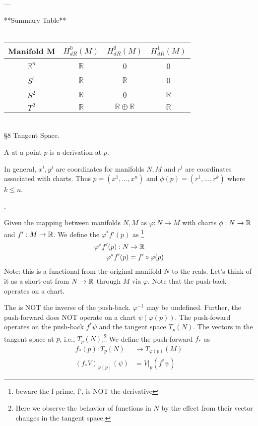\documentclass[10pt,a4paper]{report}
\begin{document}
 ---

 **Summary Table**\\ \\
 \begin{tabular}{|c|c|c|c|}
 \hline
  Manifold M & $H^0_{dR}(M)$ & $H^2_{dR}(M)$& $H^1_{dR}(M)$ \\
 \hline
  \( \mathbb{R}^n \) & \( \mathbb{R} \) & 0 & 0 \\
 \hline
 \( S^1 \) & \( \mathbb{R} \) & \( \mathbb{R} \) & 0 \\
 \hline
  \( S^2 \) & \( \mathbb{R} \) & 0 & \( \mathbb{R} \) \\
 \hline
 \( T^2 \) & \( \mathbb{R} \) & \( \mathbb{R} \oplus \mathbb{R} \) & \( \mathbb{R} \)\\
 \hline
 \end{tabular}\\
 
 \newpage
 \Large{\S 8 Tangent Space.}
 
 \setcounter{chapter}{8}
 \setcounter{section}{1}
 
 \begin{definition}  A  at a point $p$ is a derivation at $p$.
 \end{definition}
 
 \begin{remark}
 
 In general, $x^i, y^j$ are coordinates for manifolds $N,M$ and $r^i$ are coordinates associated with charts.  Thus $p=(x^1, \dots, x^n)$ and $\phi(p)=(r^1, \dots, r^k)$ where $k \le n$.
 \end{remark}
 
 \begin{definition}.
 
 Given the mapping between manifolds $N,M$ as $\varphi: N \to M$ with charts $\phi: N \to \mathbb{R}$ and $f': M \to \mathbb{R}$.  We define the  $\varphi^*f'(p)$ as \footnote{beware the f-prime, f', is NOT the derivative}
 \begin{align*}
 	\varphi^*f'(p): N &\to \mathbb{R} \\
 	\varphi^*f'(p) &= f'\circ \varphi(p)
 \end{align*}Note: this is a functional from the original manifold $N$ to the reals.  Let's think of it as a short-cut from $N \to \mathbb{R}$ through $M$ via $\varphi$.  Note that the push-back operates on a chart.
 
 The  is NOT the inverse of the push-back.  $\varphi^{-1}$ may be undefined.  Further, the push-forward does NOT operate on a chart $\psi(\varphi(p))$.  The push-foward operates on the push-back $f^*\psi$ and the tangent space $T_p(N)$. The vectors in the tangent space at $p$, i.e., $T_p(N)$.\footnote{Here we observe the behavior of functions in $N$ by the effect from their vector changes in the tangent space.}  We define the push-forward $f_*$ as
 \begin{align*}
 	f_*(p):T_p(N) &\to T_{\varphi(p)}(M) \\
 		(f_*V)_{\varphi(p)}(\psi) &= V|_p(f^*\psi)
 \end{align*}
 
 \end{definition}
\end{document}
